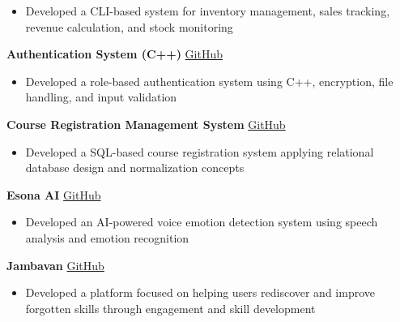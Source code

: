 \documentclass[a4paper,10.5pt]{article}
\begin{document}
\begin{itemize}
\item Developed a CLI-based system for inventory management, sales tracking, revenue calculation, and stock monitoring
\end{itemize}

\vspace{2.5pt}

\noindent
\textbf{Authentication System (C++)}
\hfill
\href{https://github.com/AP24110010250/authentication-system.git}{GitHub}

\begin{itemize}
\item Developed a role-based authentication system using C++, encryption, file handling, and input validation
\end{itemize}

\vspace{2.5pt}

\noindent
\textbf{Course Registration Management System}
\hfill
\href{https://github.com/AP24110010250/course-registration-management-system.git}{GitHub}

\begin{itemize}
\item Developed a SQL-based course registration system applying relational database design and normalization concepts
\end{itemize}

\vspace{2.5pt}

\noindent
\textbf{Esona AI}
\hfill
\href{https://github.com/AP24110010250/esona-ai.git}{GitHub}

\begin{itemize}
\item Developed an AI-powered voice emotion detection system using speech analysis and emotion recognition
\end{itemize}

\vspace{2.5pt}

\noindent
\textbf{Jambavan}
\hfill
\href{https://github.com/AP24110010250/jambavan.git}{GitHub}

\begin{itemize}
\item Developed a platform focused on helping users rediscover and improve forgotten skills through engagement and skill development
\end{itemize}

\end{document}
